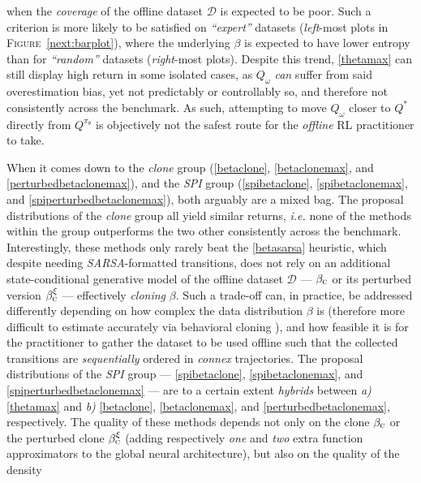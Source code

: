 when the \emph{coverage} of the offline dataset $\mathcal{D}$ is expected to be poor.
Such a criterion is more likely to be satisfied
on \textit{``expert''} datasets (\emph{left}-most plots in \textsc{Figure}~\ref{next:barplot}),
where the underlying $\beta$ is expected to have lower entropy
than for \textit{``random''} datasets (\emph{right}-most plots).
Despite this trend, \ref{thetamax} can still display high return in some isolated cases,
as $Q_\omega$ \emph{can} suffer from said overestimation bias, yet not predictably or controllably so,
and therefore not consistently across the benchmark.
As such, attempting to move $Q_\omega$ closer to $Q^*$ directly from $Q^{\pi_\theta}$
is objectively not the safest route for the \emph{offline} RL practitioner to take.

When it comes down to the \textit{clone} group
(\ref{betaclone}, \ref{betaclonemax}, and \ref{perturbedbetaclonemax}),
and the \textit{SPI} group
(\ref{spibetaclone}, \ref{spibetaclonemax}, and \ref{spiperturbedbetaclonemax}),
both arguably are a mixed bag.
The proposal distributions of the \textit{clone} group all yield similar returns, \textit{i.e.}
none of the methods within the group outperforms the two other consistently across the benchmark.
Interestingly, these methods only rarely beat the \ref{betasarsa} heuristic, which despite needing
\textit{SARSA}-formatted transitions, does not rely on an additional state-conditional generative model of
the offline dataset $\mathcal{D}$ ---
$\beta_\textsc{c}$ or its perturbed version $\beta_\textsc{c}^\xi$ ---
effectively \textit{cloning} $\beta$.
Such a trade-off can, in practice, be addressed differently depending on how complex the data distribution $\beta$ is
(therefore more difficult to estimate accurately via behavioral cloning
\cite{Pomerleau1989-nh, Pomerleau1990-lm, Ratliff2007-fc, Bagnell2015-ni}),
and how feasible it is for the practitioner to gather the dataset to be used offline such that the
collected transitions are \emph{sequentially} ordered in \emph{connex} trajectories.
The proposal distributions of the \textit{SPI} group
--- \ref{spibetaclone}, \ref{spibetaclonemax}, and \ref{spiperturbedbetaclonemax} --- are to a certain extent
\textit{hybrids} between \textit{a)} \ref{thetamax} and \textit{b)}
\ref{betaclone}, \ref{betaclonemax}, and \ref{perturbedbetaclonemax}, respectively.
The quality of these methods depends not only on the clone $\beta_\textsc{c}$ or
the perturbed clone $\beta_\textsc{c}^\xi$ (adding respectively \emph{one} and \emph{two} extra
function approximators to the global neural architecture), but also on the quality of the density
